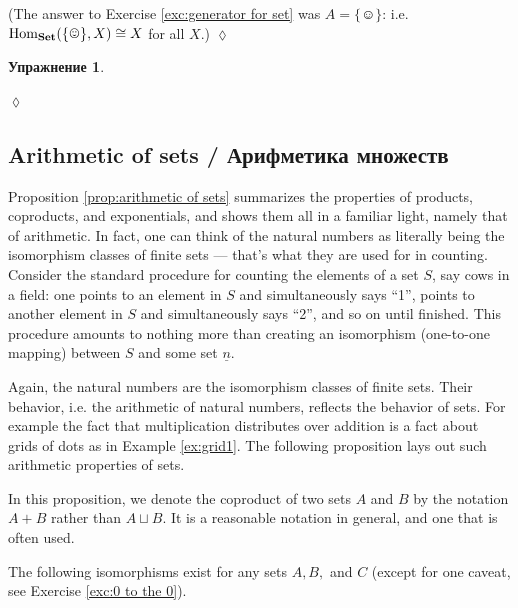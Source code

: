 \documentclass[a4paper]{book}
\def\tn{\textnormal}
\def\Hom{\tn{Hom}}
\def\singleton{\{\smiley\}}
\def\iso{\cong}
\def\ul{\underline}
\def\Set{{\bf Set}}
\theoremstyle{myth}
\newtheorem{propositionENG}[envENG]{\begin{english}Proposition\end{english}}
\newtheorem{excENG}[envENG]{\begin{english}Exercise\end{english}}
\newenvironment{exerciseENG}{\begin{excENG}}{\hspace*{\fill}$\lozenge$\end{excENG}}
\newtheorem{excRUS}[envRUS]{Упражнение}
\newenvironment{exerciseRUS}{\begin{excRUS}}{\hspace*{\fill}$\lozenge$\end{excRUS}}
\begin{document}
\begin{russian}
\begin{exerciseENG}
(The answer to Exercise \ref{exc:generator for set} was $A=\singleton$: i.e. $\Hom_\Set(\singleton,X)\iso X$ for all $X$.)
\end{exerciseENG}

\begin{exerciseRUS}\label{exc:two R2s}
 
\end{exerciseRUS}


\subsection{Arithmetic of sets / Арифметика множеств}\label{sec:arithmetic of sets}

Proposition \ref{prop:arithmetic of sets} summarizes the properties of products, coproducts, and exponentials, and shows them all in a familiar light, namely that of arithmetic. In fact, one can think of the natural numbers as literally being the isomorphism classes of finite sets — that's what they are used for in counting. Consider the standard procedure for counting the elements of a set $S$, say cows in a field: one points to an element in $S$ and simultaneously says “1”, points to another element in $S$ and simultaneously says “2”, and so on until finished. This procedure amounts to nothing more than creating an isomorphism (one-to-one mapping) between $S$ and some set $\ul{n}$. 

 

Again, the natural numbers are the isomorphism classes of finite sets. Their behavior, i.e. the arithmetic of natural numbers, reflects the behavior of sets. For example the fact that multiplication distributes over addition is a fact about grids of dots as in Example \ref{ex:grid1}. The following proposition lays out such arithmetic properties of sets.

 

In this proposition, we denote the coproduct of two sets $A$ and $B$ by the notation $A+B$ rather than $A\sqcup B$. It is a reasonable notation in general, and one that is often used. 

 

\begin{propositionENG}\label{prop:arithmetic of sets}
The following isomorphisms exist for any sets $A,B,$ and $C$ (except for one caveat, see Exercise \ref{exc:0 to the 0}). 
 

\end{propositionENG}
\end{russian}
\end{document}
